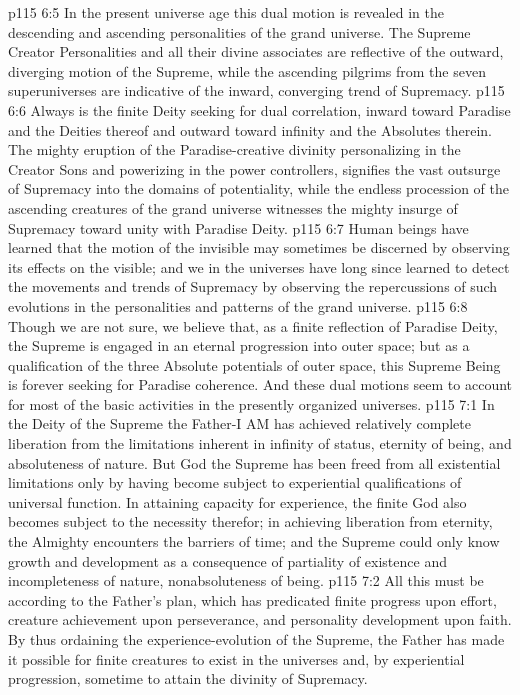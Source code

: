 \vs p115 6:5 In the present universe age this dual motion is revealed in the descending and ascending personalities of the grand universe. The Supreme Creator Personalities and all their divine associates are reflective of the outward, diverging motion of the Supreme, while the ascending pilgrims from the seven superuniverses are indicative of the inward, converging trend of Supremacy.
\vs p115 6:6 Always is the finite Deity seeking for dual correlation, inward toward Paradise and the Deities thereof and outward toward infinity and the Absolutes therein. The mighty eruption of the Paradise\hyp{}creative divinity personalizing in the Creator Sons and powerizing in the power controllers, signifies the vast outsurge of Supremacy into the domains of potentiality, while the endless procession of the ascending creatures of the grand universe witnesses the mighty insurge of Supremacy toward unity with Paradise Deity.
\vs p115 6:7 Human beings have learned that the motion of the invisible may sometimes be discerned by observing its effects on the visible; and we in the universes have long since learned to detect the movements and trends of Supremacy by observing the repercussions of such evolutions in the personalities and patterns of the grand universe.
\vs p115 6:8 Though we are not sure, we believe that, as a finite reflection of Paradise Deity, the Supreme is engaged in an eternal progression into outer space; but as a qualification of the three Absolute potentials of outer space, this Supreme Being is forever seeking for Paradise coherence. And these dual motions seem to account for most of the basic activities in the presently organized universes.
\vs p115 7:1 In the Deity of the Supreme the Father\hyp{}I AM has achieved relatively complete liberation from the limitations inherent in infinity of status, eternity of being, and absoluteness of nature. But God the Supreme has been freed from all existential limitations only by having become subject to experiential qualifications of universal function. In attaining capacity for experience, the finite God also becomes subject to the necessity therefor; in achieving liberation from eternity, the Almighty encounters the barriers of time; and the Supreme could only know growth and development as a consequence of partiality of existence and incompleteness of nature, nonabsoluteness of being.
\vs p115 7:2 All this must be according to the Father’s plan, which has predicated finite progress upon effort, creature achievement upon perseverance, and personality development upon faith. By thus ordaining the experience\hyp{}evolution of the Supreme, the Father has made it possible for finite creatures to exist in the universes and, by experiential progression, sometime to attain the divinity of Supremacy.

